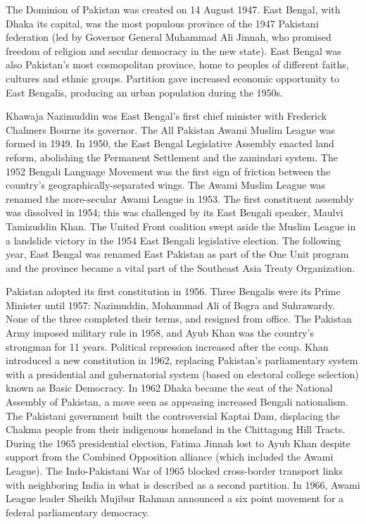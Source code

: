 The Dominion of Pakistan was created on 14 August 1947. East Bengal,
with Dhaka its capital, was the most populous province of the 1947
Pakistani federation (led by Governor General Muhammad Ali Jinnah, who
promised freedom of religion and secular democracy in the new state).
East Bengal was also Pakistan's most cosmopolitan province, home to
peoples of different faiths, cultures and ethnic groups. Partition gave
increased economic opportunity to East Bengalis, producing an urban
population during the 1950s.

Khawaja Nazimuddin was East Bengal's first chief minister with Frederick
Chalmers Bourne its governor. The All Pakistan Awami Muslim League was
formed in 1949. In 1950, the East Bengal Legislative Assembly enacted
land reform, abolishing the Permanent Settlement and the zamindari
system. The 1952 Bengali Language Movement was the first sign of
friction between the country's geographically-separated wings. The Awami
Muslim League was renamed the more-secular Awami League in 1953. The
first constituent assembly was dissolved in 1954; this was challenged by
its East Bengali speaker, Maulvi Tamizuddin Khan. The United Front
coalition swept aside the Muslim League in a landslide victory in the
1954 East Bengali legislative election. The following year, East Bengal
was renamed East Pakistan as part of the One Unit program and the
province became a vital part of the Southeast Asia Treaty Organization.

Pakistan adopted its first constitution in 1956. Three Bengalis were its
Prime Minister until 1957: Nazimuddin, Mohammad Ali of Bogra and
Suhrawardy. None of the three completed their terms, and resigned from
office. The Pakistan Army imposed military rule in 1958, and Ayub Khan
was the country's strongman for 11 years. Political repression increased
after the coup. Khan introduced a new constitution in 1962, replacing
Pakistan's parliamentary system with a presidential and gubernatorial
system (based on electoral college selection) known as Basic Democracy.
In 1962 Dhaka became the seat of the National Assembly of Pakistan, a
move seen as appeasing increased Bengali nationalism. The Pakistani
government built the controversial Kaptai Dam, displacing the Chakma
people from their indigenous homeland in the Chittagong Hill Tracts.
During the 1965 presidential election, Fatima Jinnah lost to Ayub Khan
despite support from the Combined Opposition alliance (which included
the Awami League). The Indo-Pakistani War of 1965 blocked cross-border
transport links with neighboring India in what is described as a second
partition. In 1966, Awami League leader Sheikh Mujibur Rahman announced
a six point movement for a federal parliamentary democracy.

